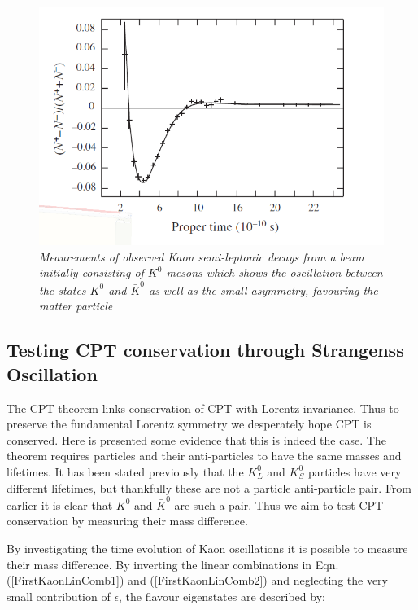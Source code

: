 \begin{figure}[h!]
\begin{center}
\includegraphics[scale=0.4]{figs/Asymmetry_pic}
\end{center}
\caption{\textit{Meaurements of observed Kaon semi-leptonic decays from a beam initially consisting of $K^{0}$ mesons which shows the oscillation between the states $K^{0}$ and $\bar{K}^{0}$ as well as the small asymmetry, favouring the matter particle \cite{AsymmetryPic}}}
\label{AsymmetryPicFig}
\end{figure}


\subsection{Testing CPT conservation through Strangenss Oscillation}

The CPT theorem links conservation of CPT with Lorentz invariance. Thus to preserve the fundamental Lorentz symmetry we desperately hope CPT is conserved. Here is presented some evidence that this is indeed the case. The theorem requires particles and their anti-particles to have the same masses and lifetimes. It has been stated previously that the $K^{0}_{L}$ and $K^{0}_{S}$ particles have very different lifetimes, but thankfully these are not a particle anti-particle pair. From earlier it is clear that $K^{0}$ and $\bar{K}^{0}$ are such a pair. Thus we aim to test CPT conservation by measuring their mass difference.    

By investigating the time evolution of Kaon oscillations it is possible to measure their mass difference. By inverting the linear combinations in Eqn.(\ref{FirstKaonLinComb1}) and (\ref{FirstKaonLinComb2}) and neglecting the very small contribution of $\epsilon$, the flavour eigenstates are described by:

